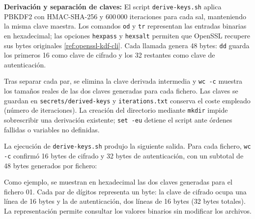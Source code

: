 \begingroup
\renewcommand{\lstlistingname}{Script}

\endgroup

\textbf{Derivación y separación de claves:} El script \texttt{derive-keys.sh} aplica PBKDF2 con HMAC-SHA-256 y 600\,000 iteraciones para cada sal, manteniendo la misma clave maestra.
Los comandos \texttt{od} y \texttt{tr} representan las entradas binarias en hexadecimal; las opciones \texttt{hexpass} y \texttt{hexsalt} permiten que OpenSSL recupere sus bytes originales \ref{ref:openssl-kdf-cli}.
Cada llamada genera 48 bytes: \texttt{dd} guarda los primeros 16 como clave de cifrado y los 32 restantes como clave de autenticación.

Tras separar cada par, se elimina la clave derivada intermedia y \texttt{wc -c} muestra los tamaños reales de las dos claves generadas para cada fichero.
Las claves se guardan en \texttt{secrets/derived-keys} y \texttt{iterations.txt} conserva el coste empleado (número de iteraciones).
La creación del directorio mediante \texttt{mkdir} impide sobrescribir una derivación existente; \texttt{set -eu} detiene el script ante órdenes fallidas o variables no definidas.

\begingroup
\renewcommand{\lstlistingname}{Script}

\endgroup

La ejecución de \texttt{derive-keys.sh} produjo la siguiente salida.
Para cada fichero, \texttt{wc -c} confirmó 16 bytes de cifrado y 32 bytes de autenticación, con un subtotal de 48 bytes generados por fichero:

\begingroup
\renewcommand{\lstlistingname}{Salida y verificación}

\endgroup

Como ejemplo, se muestran en hexadecimal las dos claves generadas para el fichero 01.
Cada par de dígitos representa un byte: la clave de cifrado ocupa una línea de 16 bytes y la de autenticación, dos líneas de 16 bytes (32 bytes totales).
La representación permite consultar los valores binarios sin modificar los archivos.

\begingroup
{}

\endgroup
